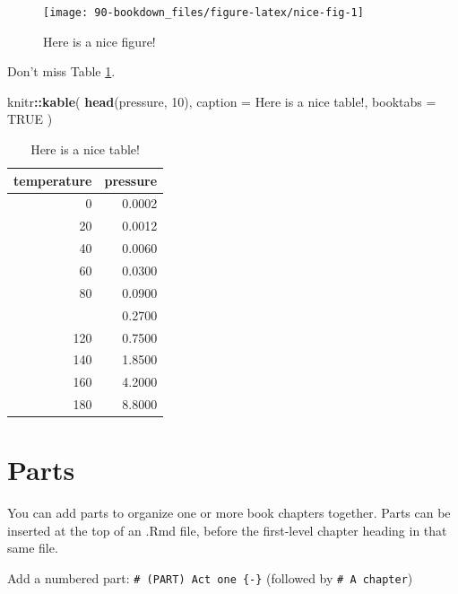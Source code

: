 \documentclass[
  xelatex, ja=standard]{bxjsbook}
\newenvironment{Shaded}{\begin{snugshade}}{\end{snugshade}}
\newcommand{\AttributeTok}[1]{\textcolor[rgb]{0.13,0.29,0.53}{#1}}
\newcommand{\ConstantTok}[1]{\textcolor[rgb]{0.56,0.35,0.01}{#1}}
\newcommand{\DecValTok}[1]{\textcolor[rgb]{0.00,0.00,0.81}{#1}}
\newcommand{\FunctionTok}[1]{\textcolor[rgb]{0.13,0.29,0.53}{\textbf{#1}}}
\newcommand{\NormalTok}[1]{#1}
\newcommand{\SpecialCharTok}[1]{\textcolor[rgb]{0.81,0.36,0.00}{\textbf{#1}}}
\newcommand{\StringTok}[1]{\textcolor[rgb]{0.31,0.60,0.02}{#1}}
\theoremstyle{definition}
\theoremstyle{definition}
\theoremstyle{definition}
\theoremstyle{definition}
\theoremstyle{remark}
\begin{document}
\begin{figure}

{\centering \texttt{[image: 90-bookdown\_files/figure-latex/nice-fig-1]} 

}

\caption{Here is a nice figure!}\label{fig:nice-fig}
\end{figure}

Don't miss Table \ref{tab:nice-tab}.

\begin{Shaded}
\begin{Highlighting}[]
\NormalTok{knitr}\SpecialCharTok{::}\FunctionTok{kable}\NormalTok{(}
  \FunctionTok{head}\NormalTok{(pressure, }\DecValTok{10}\NormalTok{), }\AttributeTok{caption =} \StringTok{\textquotesingle{}Here is a nice table!\textquotesingle{}}\NormalTok{,}
  \AttributeTok{booktabs =} \ConstantTok{TRUE}
\NormalTok{)}
\end{Highlighting}
\end{Shaded}

\begin{table}

\caption{\label{tab:nice-tab}Here is a nice table!}
\centering
\begin{tabular}[t]{rr}
\toprule
temperature & pressure\\
\midrule
0 & 0.0002\\
20 & 0.0012\\
40 & 0.0060\\
60 & 0.0300\\
80 & 0.0900\\
\addlinespace
100 & 0.2700\\
120 & 0.7500\\
140 & 1.8500\\
160 & 4.2000\\
180 & 8.8000\\
\bottomrule
\end{tabular}
\end{table}

\hypertarget{parts}{%
\section{Parts}\label{parts}}

You can add parts to organize one or more book chapters together. Parts can be inserted at the top of an .Rmd file, before the first-level chapter heading in that same file.

Add a numbered part: \texttt{\#\ (PART)\ Act\ one\ \{-\}} (followed by \texttt{\#\ A\ chapter})
\end{document}
